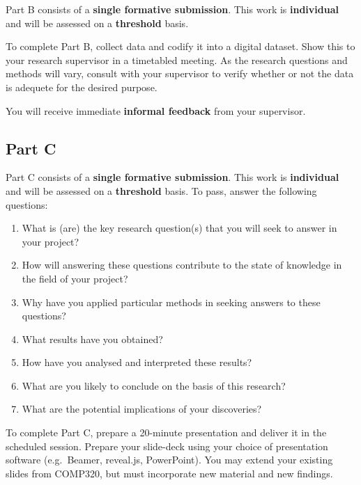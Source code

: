 \documentclass{../fal_assignment}
\begin{document}
Part B consists of a \textbf{single formative submission}.
This work is \textbf{individual} and will be assessed on a \textbf{threshold} basis.

To complete Part B, collect data and codify it into a digital dataset. Show this to your research supervisor in a timetabled meeting. 
As the research questions and methods will vary, consult with your supervisor to verify whether or not the
data is adequete for the desired purpose.

You will receive immediate \textbf{informal feedback} from your supervisor.


\subsection*{Part C}

Part C consists of a \textbf{single formative submission}.
This work is \textbf{individual} and will be assessed on a \textbf{threshold} basis.
To pass, answer the following questions:

\begin{enumerate}[label=(\roman*)]
	\item What is (are) the key research question(s) that you will seek to answer in your project?
	\item How will answering these questions contribute to the state of knowledge in the field of your project?
	\item Why have you applied particular methods in seeking answers to these questions?
	\item What results have you obtained?
	\item How have you analysed and interpreted these results?
	\item What are you likely to conclude on the basis of this research?
	\item What are the potential implications of your discoveries?
\end{enumerate}

To complete Part C, prepare a 20-minute presentation and deliver it in the scheduled session. Prepare your slide-deck using your choice of presentation software (e.g.\ Beamer, reveal.js, PowerPoint). You may extend your existing slides from COMP320, but must incorporate new material and new findings.
\end{document}
